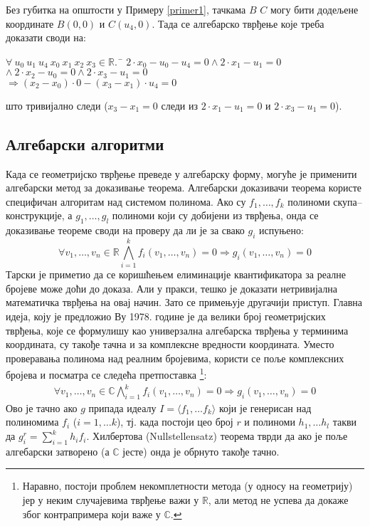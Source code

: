 \begin{primer}
Без губитка на општости у Примеру \ref{primer1}, тачкама $B$ $C$ могу
бити додељене координате $B(0, 0)$ и $C(u_4, 0)$. Тада се алгебарско
тврђење које треба доказати своди на:
\begin{tabbing}
$\forall\ u_0\ u_1\ u_4\ x_0\ x_1\ x_2\ x_3 \in \mathbb{R}.\ $ \= $2\cdot x_0 - u_0 - u_4 = 0 \land 2\cdot x_1 - u_1 = 0$ \\
                                                             \> $\land\ 2\cdot x_2 - u_0 = 0 \land 2\cdot x_3 - u_1 = 0$ \\
                                                             \> $\Longrightarrow (x_2 - x_0 ) \cdot 0 - (x_3 - x_1 )\cdot u_4 = 0$
\end{tabbing}
што тривијално следи ($x_3 − x_1 = 0$ следи из $2\cdot x_1 - u_1 = 0$
и $2\cdot x_3 - u_1 = 0$).
\end{primer}

\subsection{Алгебарски алгоритми}

Када се геометријско тврђење преведе у алгебарску форму, могуће је
применити алгебарски метод за доказивање теорема. Алгебарски
доказивачи теорема користе специфичан алгоритам над системом
полинома. Ако су $f_1, \ldots, f_k$ полиноми скупа--конструкције, а
$g_1, \ldots, g_l$ полиноми који су добијени из тврђења, онда се
доказивање теореме своди на проверу да ли је за свако $g_i$ испуњено:
$$\forall v_1, \ldots, v_n \in \mathbb{R} \bigwedge_{i=1}^k f_i(v_1,
\ldots, v_n) = 0 \Longrightarrow g_i(v_1, \ldots, v_n) = 0$$ Тарски је
приметио да се коришћењем елиминације квантификатора за реалне бројеве
може доћи до доказа. Али у пракси, тешко је доказати нетривијална
математичка тврђења на овај начин. Зато се примењује другачији
приступ. Главна идеја, коју је предложио Ву 1978. године је да велики
број геометријских тврђења, које се формулишу као универзална
алгебарска тврђења у терминима координата, су такође тачна и за
комплексне вредности координата. Уместо проверавања полинома над
реалним бројевима, користи се поље комплексних бројева и посматра се
следећа претпоставка \footnote{Наравно, постоји проблем некомплетности
  метода (у односу на геометрију) јер у неким случајевима тврђење важи
  у $\mathbb{R}$, али метод не успева да докаже због контрапримера
  који важе у $\mathbb{C}$.  }:
\begin{align}
\forall v_1, \ldots, v_n \in \mathbb{C} \bigwedge_{i=1}^k f_i(v_1,
\ldots, v_n) = 0 \Longrightarrow g_i(v_1, \ldots, v_n) = 0 \label{jednacina}
\end{align}
Ово је
тачно ако $g$ припада идеалу $I = \langle f_1, \ldots f_k \rangle$
који је генерисан над полиномима $f_i$ ($i = 1, \ldots k$), тј. када
постоји цео број $r$ и полиноми $h_1, \ldots h_l$ такви да $g_i^r =
\sum_{i=1}^k h_if_i$. Хилбертова (Nullstellensatz) теорема тврди да
ако је поље алгебарски затворено (а $\mathbb{C}$ јесте) онда је
обрнуто такође тачно.

